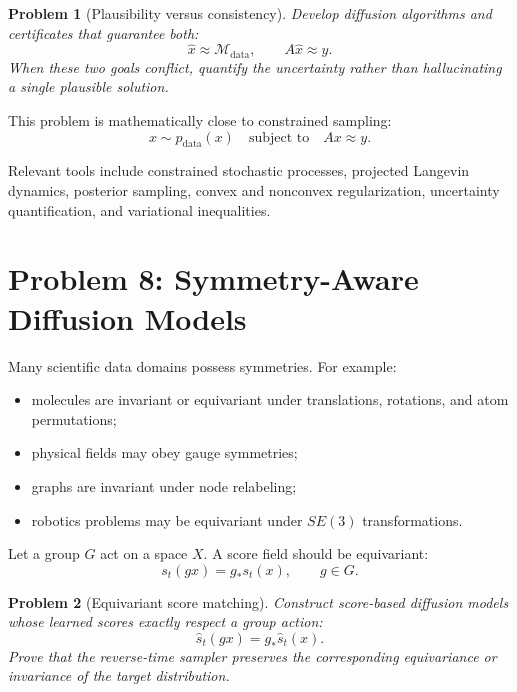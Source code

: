 \documentclass[11pt]{article}
\newtheorem{problem}{Problem}
\begin{document}
\begin{problem}[Plausibility versus consistency]
Develop diffusion algorithms and certificates that guarantee both:
\begin{equation}
\widehat{x} \approx \mathcal{M}_{\mathrm{data}},
\qquad
A\widehat{x} \approx y.
\end{equation}
When these two goals conflict, quantify the uncertainty rather than hallucinating a single plausible solution.
\end{problem}

This problem is mathematically close to constrained sampling:
\begin{equation}
x \sim p_{\mathrm{data}}(x)
\quad \text{subject to} \quad
A x \approx y.
\end{equation}

Relevant tools include constrained stochastic processes, projected Langevin dynamics, posterior sampling, convex and nonconvex regularization, uncertainty quantification, and variational inequalities.

\section{Problem 8: Symmetry-Aware Diffusion Models}

Many scientific data domains possess symmetries. For example:
\begin{itemize}[leftmargin=*]
\item molecules are invariant or equivariant under translations, rotations, and atom permutations;
\item physical fields may obey gauge symmetries;
\item graphs are invariant under node relabeling;
\item robotics problems may be equivariant under $SE(3)$ transformations.
\end{itemize}

Let a group $G$ act on a space $X$. A score field should be equivariant:
\begin{equation}
s_t(gx) = g_\ast s_t(x),
\qquad g \in G.
\end{equation}

\begin{problem}[Equivariant score matching]
Construct score-based diffusion models whose learned scores exactly respect a group action:
\begin{equation}
\widehat{s}_t(gx) = g_\ast \widehat{s}_t(x).
\end{equation}
Prove that the reverse-time sampler preserves the corresponding equivariance or invariance of the target distribution.
\end{problem}
\end{document}
